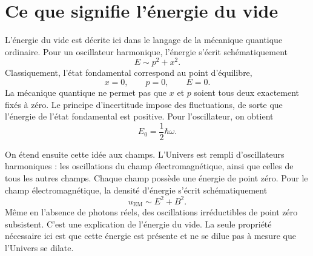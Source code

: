 \section{Ce que signifie l’énergie du vide}

L’énergie du vide est décrite ici dans le langage de la mécanique quantique ordinaire. Pour un oscillateur harmonique, l’énergie s’écrit schématiquement
\begin{equation}
E\sim p^2+x^2.
\end{equation}
Classiquement, l’état fondamental correspond au point d’équilibre,
\begin{equation}
x=0,\qquad p=0,\qquad E=0.
\end{equation}
La mécanique quantique ne permet pas que \(x\) et \(p\) soient tous deux exactement fixés à zéro. Le principe d’incertitude impose des fluctuations, de sorte que l’énergie de l’état fondamental est positive. Pour l’oscillateur, on obtient
\begin{equation}
E_0=\frac{1}{2}\hbar\omega.
\end{equation}

On étend ensuite cette idée aux champs. L’Univers est rempli d’oscillateurs harmoniques : les oscillations du champ électromagnétique, ainsi que celles de tous les autres champs. Chaque champ possède une énergie de point zéro. Pour le champ électromagnétique, la densité d’énergie s’écrit schématiquement
\begin{equation}
u_{\mathrm{EM}}\sim E^2+B^2.
\end{equation}
Même en l’absence de photons réels, des oscillations irréductibles de point zéro subsistent. C’est une explication de l’énergie du vide. La seule propriété nécessaire ici est que cette énergie est présente et ne se dilue pas à mesure que l’Univers se dilate.

\begin{classroomqa}
\end{classroomqa}

